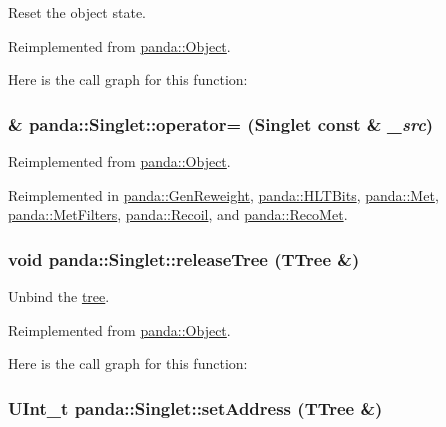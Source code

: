 Reset the object state. 

Reimplemented from \hyperlink{classpanda_1_1Object_a204960e5f165a28176f9b4a42b9ea90c}{panda::Object}.

Here is the call graph for this function:\hypertarget{classpanda_1_1Singlet_a161b3df14c430fd7f1afdd64d098b211}{
\subsubsection[{operator=}]{\& panda::Singlet::operator= ({\bf Singlet} const \& {\em \_\-src})}}
\label{classpanda_1_1Singlet_a161b3df14c430fd7f1afdd64d098b211}


Reimplemented from \hyperlink{classpanda_1_1Object_a083629646c455db50ea99b994aac3b7b}{panda::Object}.

Reimplemented in \hyperlink{classpanda_1_1GenReweight_a6dd54fb7e34a557beaf06698662a6831}{panda::GenReweight}, \hyperlink{classpanda_1_1HLTBits_ac58854e1b3ad1889afb461326f9f6d1c}{panda::HLTBits}, \hyperlink{classpanda_1_1Met_a75a8d56e25e884dfd9bdeff20b3d0b61}{panda::Met}, \hyperlink{classpanda_1_1MetFilters_a7afdb0c8ff9d453cb699a8895ac07afa}{panda::MetFilters}, \hyperlink{classpanda_1_1Recoil_a4915faccef273487495e3ec4a0c8176a}{panda::Recoil}, and \hyperlink{classpanda_1_1RecoMet_a9457a28604d28d4f06346a121874dc27}{panda::RecoMet}.\hypertarget{classpanda_1_1Singlet_aee6f5070599294eaef7a88b88dad389a}{
\subsubsection[{releaseTree}]{\setlength{\rightskip}{0pt plus 5cm}void panda::Singlet::releaseTree (TTree \&)}}
\label{classpanda_1_1Singlet_aee6f5070599294eaef7a88b88dad389a}


Unbind the \hyperlink{namespacepanda_1_1tree}{tree}. 

Reimplemented from \hyperlink{classpanda_1_1Object_aaf58438092b42a89b838ce12c6a23833}{panda::Object}.

Here is the call graph for this function:\hypertarget{classpanda_1_1Singlet_ac5daab18f365a00fe5dbdc887d173e05}{
\subsubsection[{setAddress}]{\setlength{\rightskip}{0pt plus 5cm}UInt\_\-t panda::Singlet::setAddress (TTree \&)}}
\label{classpanda_1_1Singlet_ac5daab18f365a00fe5dbdc887d173e05}



